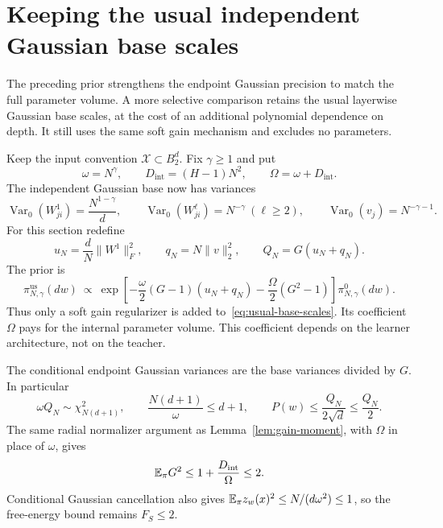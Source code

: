 \section{Keeping the usual independent Gaussian base scales}
\label{sec:original-scale-variant}
The preceding prior strengthens the endpoint Gaussian precision to match the full parameter volume. A more selective comparison retains the usual layerwise Gaussian base scales, at the cost of an additional polynomial dependence on depth. It still uses the same soft gain mechanism and excludes no parameters.

Keep the input convention $\mathcal X\subset B_2^d$. Fix $\gamma\ge1$ and put
\[
 \omega=N^\gamma,\qquad D_{\mathrm{int}}=(H-1)N^2,\qquad
 \Omega=\omega+D_{\mathrm{int}}.
\]
The independent Gaussian base now has variances
\begin{equation}
 \operatorname{Var}_0(W^1_{ji})=\frac{N^{1-\gamma}}d,\qquad
 \operatorname{Var}_0(W^\ell_{ji})=N^{-\gamma}\ (\ell\ge2),\qquad
 \operatorname{Var}_0(v_j)=N^{-\gamma-1}.
 \label{eq:usual-base-scales}
\end{equation}
For this section redefine
\[
 u_N=\frac dN\|W^1\|_F^2,\qquad q_N=N\|v\|_2^2,\qquad Q_N=G(u_N+q_N).
\]
The prior is
\begin{equation}
 \pi^{\mathrm{us}}_{N,\gamma}(dw)\ \propto\
 \exp\left[-\frac\omega2(G-1)(u_N+q_N)
            -\frac\Omega2(G^2-1)\right]\pi^0_{N,\gamma}(dw).
 \label{eq:usual-soft-prior}
\end{equation}
Thus only a soft gain regularizer is added to~\eqref{eq:usual-base-scales}. Its coefficient $\Omega$ pays for the internal parameter volume. This coefficient depends on the learner architecture, not on the teacher.

The conditional endpoint Gaussian variances are the base variances divided by $G$. In particular
\begin{equation}
 \omega Q_N\sim\chi^2_{N(d+1)},\qquad
 \frac{N(d+1)}\omega\le d+1,\qquad
 P(w)\le\frac{Q_N}{2\sqrt d}\le\frac{Q_N}{2}.
 \label{eq:usual-energy}
\end{equation}
The same radial normalizer argument as Lemma~\ref{lem:gain-moment}, with $\Omega$ in place of $\omega$, gives
\begin{equation}
 \mathbb E_\pi G^2\le1+\frac{D_{\mathrm{int}}}{\Omega}\le2.
 \label{eq:usual-gain}
\end{equation}
Conditional Gaussian cancellation also gives $\mathbb E_\pi z_w(x)^2\le N/(d\omega^2)\le1$, so the free-energy bound remains $F_S\le2$.

